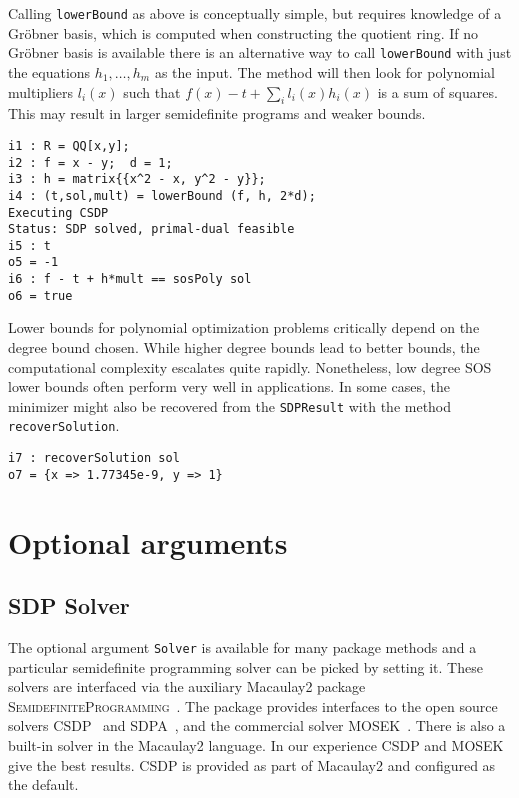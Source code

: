 \documentclass[11pt]{amsart}
\theoremstyle{plain}%
\theoremstyle{definition}
\theoremstyle{remark}
\newcommand{\Mac}{Macaulay2\xspace}
\newcommand{\SDP}{\textsc{SemidefiniteProgramming}\xspace}
\begin{document}
Calling \verb|lowerBound| as above is conceptually simple, but requires knowledge of a Gröbner basis, which is computed when constructing the quotient ring.
If no Gröbner basis is available there is an alternative way to call \verb|lowerBound| with just the equations $h_1,\dots,h_m$ as the input.
The method will then look for polynomial multipliers $l_i(x)$ such that $f(x) - t + \sum_i l_i(x)h_i(x)$ is a sum of squares.
This may result in larger semidefinite programs and weaker bounds.

{\small
\begin{verbatim}
i1 : R = QQ[x,y];
i2 : f = x - y;  d = 1;
i3 : h = matrix{{x^2 - x, y^2 - y}};
i4 : (t,sol,mult) = lowerBound (f, h, 2*d);
Executing CSDP
Status: SDP solved, primal-dual feasible
i5 : t
o5 = -1
i6 : f - t + h*mult == sosPoly sol
o6 = true
\end{verbatim}
}

Lower bounds for polynomial optimization problems critically depend on the degree bound chosen.
While higher degree bounds lead to better bounds, the computational complexity escalates quite rapidly.
Nonetheless, low degree SOS lower bounds often perform very well in applications.
In some cases, the minimizer might also be recovered from the \verb|SDPResult| with the method \verb|recoverSolution|.

{\small
\begin{verbatim}
i7 : recoverSolution sol
o7 = {x => 1.77345e-9, y => 1}
\end{verbatim}
}

\section{Optional arguments}
\label{s:arguments}

\subsection*{SDP Solver}
The optional argument \verb|Solver| is available for many package methods and a particular semidefinite programming solver can be picked by setting it.
These solvers are interfaced via the auxiliary Macaulay2 package \SDP~\cite{sdpM2}.
The package provides interfaces to the open source solvers CSDP~\cite{borchers1999csdp} and SDPA~\cite{yamashita2003implementation}, and the commercial solver MOSEK~\cite{mosek}.
There is also a built-in solver in the \Mac language.
In our experience CSDP and MOSEK give the best results.
CSDP is provided as part of \Mac and configured as the default.
\end{document}
